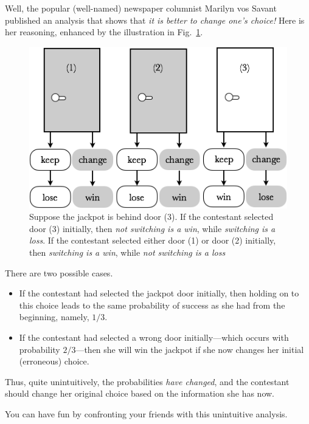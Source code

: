 Well, the popular (well-named) newspaper columnist Marilyn vos Savant published an analysis that shows that {\em it is better to change one's choice!}  Here is her reasoning, enhanced by the illustration in Fig.~\ref{fig:MonthyHall-2}.
\begin{figure}[htb]
\begin{center}
        \includegraphics[scale=0.4]{FiguresMaths/MonthyHall}
        \caption{Suppose the jackpot is behind door (3).  If the contestant selected door (3) initially, then {\em not switching is a win}, while {\em switching is a loss}.  If the contestant selected either door (1) or door (2) initially, then {\em switching is a win}, while {\em not switching is a loss}}
        \label{fig:MonthyHall-2}
\end{center}
\end{figure}
There are two possible cases.
\begin{itemize}
\item
If the contestant had selected the jackpot door initially, then holding on to this choice leads to the same probability of success as she had from the beginning, namely, $1/3$.
\medskip\item
If the contestant had selected a wrong door initially---which occurs with probability $2/3$---then she will win the jackpot if she now changes her initial (erroneous) choice.
\end{itemize}
Thus, quite unintuitively, the probabilities {\em have changed}, and the contestant should change her original choice based on the information she has now.

\smallskip

You can have fun by confronting your friends with this unintuitive analysis.

\medskip

